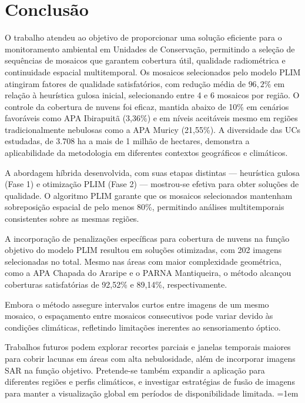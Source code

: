 \documentclass[a4paper,11pt]{article}
\begin{document}
\vspace{-8mm}
\section{Conclusão}
\vspace{-4mm}
O trabalho atendeu ao objetivo de proporcionar uma solução eficiente para o monitoramento ambiental em Unidades de Conservação, permitindo a seleção de sequências de mosaicos que garantem cobertura útil, qualidade radiométrica e continuidade espacial multitemporal. Os mosaicos selecionados pelo modelo PLIM atingiram fatores de qualidade satisfatórios, com redução média de $96,2\%$ em relação à heurística gulosa inicial, selecionando entre 4 e 6 mosaicos por região. O controle da cobertura de nuvens foi eficaz, mantida abaixo de 10\% em cenários favoráveis como APA Ibirapuitã (3,36\%) e em níveis aceitáveis mesmo em regiões tradicionalmente nebulosas como a APA Muricy (21,55\%). A diversidade das UCs estudadas, de 3.708 ha a mais de 1 milhão de hectares, demonstra a aplicabilidade da metodologia em diferentes contextos geográficos e climáticos.

A abordagem híbrida desenvolvida, com suas etapas distintas --- heurística gulosa (Fase 1) e otimização PLIM (Fase 2) --- mostrou-se efetiva para obter soluções de qualidade. O algoritmo PLIM garante que os mosaicos selecionados mantenham sobreposição espacial de pelo menos 80\%, permitindo análises multitemporais consistentes sobre as mesmas regiões.

A incorporação de penalizações específicas para cobertura de nuvens na função objetivo do modelo PLIM resultou em soluções otimizadas, com 202 imagens selecionadas no total. Mesmo nas áreas com maior complexidade geométrica, como a APA Chapada do Araripe e o PARNA Mantiqueira, o método alcançou coberturas satisfatórias de 92,52\% e 89,14\%, respectivamente.

Embora o método assegure intervalos curtos entre imagens de um mesmo mosaico, o espaçamento entre mosaicos consecutivos pode variar devido às condições climáticas, refletindo limitações inerentes ao sensoriamento óptico.

Trabalhos futuros podem explorar recortes parciais e janelas temporais maiores para cobrir lacunas em áreas com alta nebulosidade, além de incorporar imagens SAR na função objetivo. Pretende-se também expandir a aplicação para diferentes regiões e perfis climáticos, e investigar estratégias de fusão de imagens para manter a visualização global em períodos de disponibilidade limitada.
\vspace{-6mm}
\begingroup
  \sloppy
  \emergencystretch=1em
  
  
  \nocite{*}
\endgroup
\end{document}
